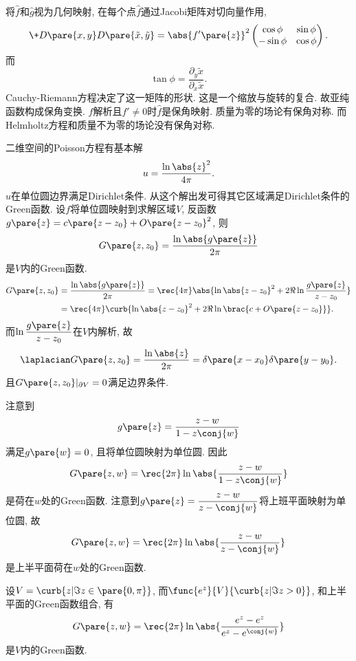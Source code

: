 \documentclass[hidelinks]{ctexart}
\begin{document}
\newpoint{}将$\hat f$和$\hat g$视为几何映射, 在每个点$\hat f$通过Jacobi矩阵对切向量作用,
\[ \+D{\pare{x,y}}D{\pare{\tilde{x},\tilde{y}}} = \abs{f'\pare{z}}^2 \begin{pmatrix}
    \cos \phi & \sin \phi \\
    -\sin\phi & \cos\phi
\end{pmatrix}. \]
而
\[ \tan \phi = \frac{\partial_y \tilde{x}}{\partial_x \tilde{x}}. \]
\newpoint{}Cauchy-Riemann方程决定了这一矩阵的形状. 这是一个缩放与旋转的复合.
\newpoint{}故亚纯函数构成保角变换.
\newpoint{}$f$解析且$f' \neq 0$时$\hat f$是保角映射.
\newpoint{}质量为零的场论有保角对称. 而Helmholtz方程和质量不为零的场论没有保角对称.
\begin{sample}
    \begin{ex}
        二维空间的Poisson方程有基本解
        \[ u = \frac{\ln \abs{z}^2}{4\pi}. \]
        $u$在单位圆边界满足Dirichlet条件. 从这个解出发可得其它区域满足Dirichlet条件的Green函数. 设$f$将单位圆映射到求解区域$V$, 反函数$g\pare{z} = c\pare{z-z_0} + O\pare{z-z_0}^2$, 则
        \[ G\pare{z,z_0} = \frac{\ln \abs{g\pare{z}}}{2\pi} \]
        是$V$内的Green函数.
        \begin{align*}
            G\pare{z,z_0} &= \frac{\ln \abs{g\pare{z}}}{2\pi} = \rec{4\pi} \abs{\ln\abs{z-z_0}^2 + 2\Re \ln \frac{g\pare{z}}{z-z_0}} \\
            &= \rec{4\pi}\curb{\ln \abs{z-z_0}^2 + 2\Re \ln \brac{c + O\pare{z-z_0}}}.
        \end{align*}
        而$\displaystyle \ln \frac{g\pare{z}}{z-z_0}$在$V$内解析, 故
        \[ \laplacian G\pare{z,z_0} = \frac{\ln \abs{z}}{2\pi} = \delta\pare{x-x_0}\delta\pare{y-y_0}. \]
        且$G\pare{z,z_0}\vert_{\partial V} = 0$满足边界条件.
    \end{ex}
\end{sample}
\newpoint{}注意到
\[ g\pare{z} = \frac{z-w}{1-z\conj{w}} \]
满足$g\pare{w} = 0$, 且将单位圆映射为单位圆. 因此
\[ G\pare{z,w} = \rec{2\pi} \ln \abs{\frac{z-w}{1-z\conj{w}}} \]
是荷在$w$处的Green函数.
\newpoint{}注意到$\displaystyle g\pare{z} = \frac{z-w}{z - \conj{w}}$将上班平面映射为单位圆, 故
\[ G\pare{z,w} = \rec{2\pi}\ln \abs{\frac{z-w}{z-\conj{w}}} \]
是上半平面荷在$w$处的Green函数.
\begin{ex}
    设$V = \curb{z\vert \Im z\in \pare{0,\pi}}$, 而$\func{e^z}{V}{\curb{z\vert \Im z>0}}$, 和上半平面的Green函数组合, 有
    \[ G\pare{z,w} = \rec{2\pi} \ln \abs{\frac{e^z-e^z}{e^z - e^{\conj{w}}}} \]
    是$V$内的Green函数.
\end{ex}
\end{document}
